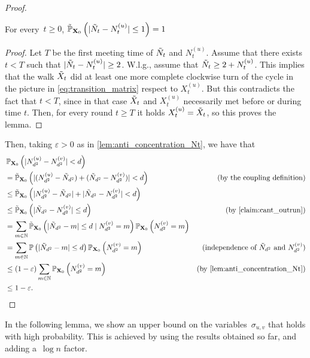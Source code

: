 \documentclass{article}
\begin{document}
\begin{proof}
    \begin{claim} \label{claim:cant_outrun}
        For every~$t \geq 0$,  $\Tilde{\operatorname{\mathbb{P}}}_{\mathbf{X}_0}\left(  |\Tilde{N}_t - N_t^{(u)}|\leq 1 \right)= 1$
    \end{claim}
    \begin{proof}
    Let $T$ be the first meeting time of $\Tilde{N}_t$ and $N_t^{(u)}$. Assume that there exists $t < T$ such that $|\Tilde{N}_t - N_t^{(u)}| \geq 2$.
    W.l.g., assume that $\Tilde{N}_t \geq 2+ N_t^{(u)}$. This implies that the walk $\Tilde{X}_t$ did at least one more complete clockwise turn of the cycle in the picture in \cref{eq:transition_matrix} respect to $X_t^{(u)}$. But this contradicts the fact that $t < T$, since in that case $\Tilde{X}_t$ and $X_t^{(u)}$ necessarily met before or during time $t$. Then, for every round $t \geq T$ it holds $X_t^{(u)} = \Tilde{X}_t$, so this proves the lemma.
      \end{proof}
        Then, taking $\varepsilon>0$ as in \cref{lem:anti_concentration_Nt}, we have that
        \begin{align*}
            & \bbP_{\mathbf{X}_0}\pa{|N^{(u)}_{d^2}-N^{(v)}_{d^2}| <  d} 
            \\ & = \Tilde{\bbP}_{\mathbf{X}_0} \pa{|(N_{d^2}^{(u)}-\Tilde{N}_{d^2}) + (\Tilde{N}_{d^2} - N_{d^2}^{(v)})| <  d}  & \text{(by the coupling definition)}
            \\ & \leq \Tilde{\bbP}_{\mathbf{X}_0} \pa{|N_{d^2}^{(u)}- \Tilde{N}_{d^2}| + |\Tilde{N}_{d^2}- N_{d^2}^{(v)}| <  d} 
            \\ & \leq \Tilde{\bbP}_{\mathbf{X}_0} \pa{|\Tilde{N}_{d^2} - N_{d^2}^{(v)}|\leq  d} &\text{(by \cref{claim:cant_outrun})}
            \\ & = \sum_{m \in \mathbb{N}}\Tilde{\bbP}_{\mathbf{X}_0}\pa{|\Tilde{N}_{d^2}- m| \leq  d \mid N_{d^2}^{(v)}= m} \bbP_{\mathbf{X}_0}\pa{N_{d^2}^{(v)} = m}
            \\ & = \sum_{m \in \mathbb{N}} \bbP \pa{|\Tilde{N}_{d^2}-m| \leq d} \bbP_{\mathbf{X}_0} \pa{N_{d^2}^{(v)} = m} & \text{(independence of $\Tilde{N}_{d^2}$ and $N_{d^2}^{(v)}$)}
            \\ &\leq (1-\varepsilon)\sum_{m \in \mathbb{N}}\bbP_{\mathbf{X}_0}\pa{N_{d^2}^{(v)} = m} & \text{(by \cref{lem:anti_concentration_Nt})}
            \\ & \leq 1-\varepsilon.
        \end{align*}
\end{proof}

In the following lemma, we show an upper bound on the variables~$\sigma_{u,v}$ that holds with high probability. This is achieved by using the results obtained so far, and adding a~$\log n$ factor.
\end{document}
